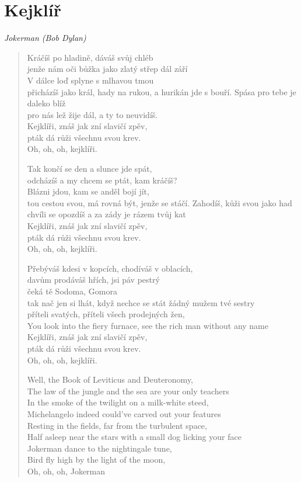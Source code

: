 \section*{Kejklíř}

\textit{Jokerman (Bob Dylan)}

\begin{verse}
Kráčíš po hladině, dáváš svůj chléb\\
jenže nám oči bůžka jako zlatý střep dál září\\ 
V dálce loď splyne s mlhavou tmou\\
přicházíš jako král, hady na rukou, a hurikán jde s bouří. 
Spása pro tebe je daleko blíž\\
pro nás lež žije dál, a ty to neuvidíš. \\
Kejklíři, znáš jak zní slavičí zpěv,\\
pták dá růži všechnu svou krev. \\
Oh, oh, oh, kejklíři.

Tak končí se den a slunce jde spát, \\
odcházíš a my chcem se ptát, kam kráčíš? \\
Blázni jdou, kam se anděl bojí jít, \\
tou cestou svou, má rovná být, jenže se stáčí.
Zahodíš, kůži svou jako had \\
chvíli se opozdíš a za zády je rázem tvůj kat \\
Kejklíři, znáš jak zní slavičí zpěv,\\
pták dá růži všechnu svou krev. \\
Oh, oh, oh, kejklíři.

Přebýváš kdesi v kopcích, chodíváš v oblacích, \\
davům prodáváš hřích, jsi páv pestrý \\
čeká tě Sodoma, Gomora \\
tak nač jen si lhát, když nechce se stát žádný mužem tvé sestry  \\
příteli svatých, příteli všech prodejných žen, \\
You look into the fiery furnace, see the rich man without any name \\
Kejklíři, znáš jak zní slavičí zpěv,\\
pták dá růži všechnu svou krev. \\
Oh, oh, oh, kejklíři.

Well, the Book of Leviticus and Deuteronomy, \\
The law of the jungle and the sea are your only teachers \\
In the smoke of the twilight on a milk-white steed, \\
Michelangelo indeed could've carved out your features \\
Resting in the fields, far from the turbulent space, \\
Half asleep near the stars with a small dog licking your face \\
Jokerman dance to the nightingale tune, \\
Bird fly high by the light of the moon, \\
Oh, oh, oh, Jokerman


\end{verse}
